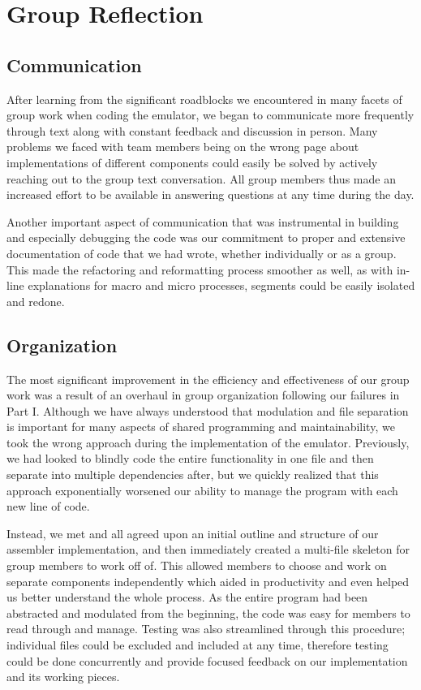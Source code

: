 \documentclass[11pt]{article}
\begin{document}
\section{Group Reflection}

\subsection{Communication}

After learning from the significant roadblocks we encountered in many facets of group work when 
coding the emulator, we began to communicate more frequently through text along with constant 
feedback and discussion in person. Many problems we faced with team members being on the wrong 
page about implementations of different components could easily be solved by actively 
reaching out to the group text conversation. All group members thus made an increased effort to be available in answering questions at any time during the day.

Another important aspect of communication that was instrumental in building and especially 
debugging the code was our commitment to proper and extensive documentation of code that we had 
wrote, whether individually or as a group. This made the refactoring and reformatting process 
smoother as well, as with in-line explanations for macro and micro processes, segments could be 
easily isolated and redone.

\subsection{Organization}

The most significant improvement in the efficiency and effectiveness of our group work was a 
result of an overhaul in group organization following our failures in Part I. Although we have 
always understood that modulation and file separation is important for many aspects of shared 
programming and maintainability, we took the wrong approach during the implementation of the 
emulator. Previously, we had looked to blindly code the entire functionality in one file and 
then separate into multiple dependencies after, but we quickly realized that this approach 
exponentially worsened our ability to manage the program with each new line of code.

Instead, we met and all agreed upon an initial outline and structure of our assembler 
implementation, and then immediately created a multi-file skeleton for group members to work 
off of. This allowed members to choose and work on separate components independently which 
aided in productivity and even helped us better understand the whole process. As the entire 
program had been abstracted and modulated from the beginning, the code was easy for members to 
read through and manage. Testing was also streamlined through this procedure; individual files 
could be excluded and included at any time, therefore testing could be done concurrently and 
provide focused feedback on our implementation and its working pieces.
\end{document}
